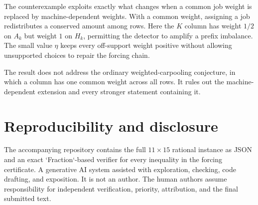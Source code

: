 \documentclass[11pt]{article}
\theoremstyle{definition}
\begin{document}
The counterexample exploits exactly what changes when a common job weight is
replaced by machine-dependent weights.  With a common weight, assigning a job
redistributes a conserved amount among rows.  Here the $K$ column has weight
$1/2$ on $A_k$ but weight $1$ on $H_k$, permitting the detector to amplify a
prefix imbalance.  The small value $\eta$ keeps every off-support weight
positive without allowing unsupported choices to repair the forcing chain.

The result does not address the ordinary weighted-carpooling conjecture, in
which a column has one common weight across all rows.  It rules out the
machine-dependent extension and every stronger statement containing it.

\section*{Reproducibility and disclosure}

The accompanying repository contains the full $11\times15$ rational instance
as JSON and an exact `Fraction`-based verifier for every inequality in the
forcing certificate.  A generative AI system assisted with exploration,
checking, code drafting, and exposition.  It is not an author.  The human
authors assume responsibility for independent verification, priority,
attribution, and the final submitted text.



\end{document}
